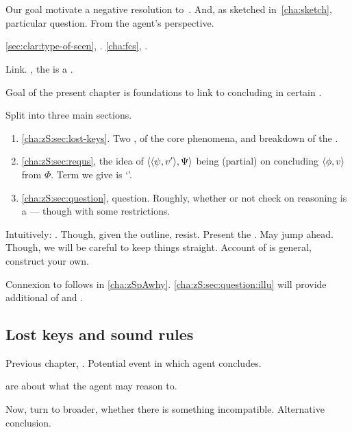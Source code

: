 \chapter{}
\label{cha:zS}

\begin{note}
  Our goal motivate a negative resolution to~\issueConstraint{}.
  And, as sketched in~\autoref{cha:sketch}, \zSN{} particular question.
  From the agent's perspective.

  \autoref{sec:clar:type-of-scen}, .
  \autoref{cha:fcs}, .

  Link.
  , the \collateral{} is a \fc{}.

  Goal of the present chapter is foundations to link  to concluding in certain .

  Split into three main sections.
  \begin{enumerate}
  \item
    \autoref{cha:zS:sec:lost-keys}.
    Two ,  of the core phenomena, and breakdown of the .
  \item
    \autoref{cha:zS:sec:requs}, the idea of \(\langle \langle \psi, v' \rangle, \Psi \rangle\) being (partial) \check{} on concluding \(\langle \phi, v \rangle\) from \(\Phi\).
    Term we give is `\requ{}'.
  \item
    \autoref{cha:zS:sec:question}, question.
    Roughly, whether or not check on reasoning is a  --- though with some restrictions.
  \end{enumerate}

  Intuitively: \qWhyV{}.
  Though, given the outline, resist.
  Present the .
  May jump ahead.
  Though, we will be careful to keep things straight.
  Account of  is general, construct your own.

  Connexion to \qWhyV{} follows in \autoref{cha:zSpAwhy}.
  \autoref{cha:zS:sec:question:illu} will provide additional  of \requ{} and \qzS{}.
\end{note}

\section{Lost keys and sound rules}
\label{cha:zS:sec:lost-keys}

\begin{note}
  Previous chapter, .
  Potential event in which agent concludes.

   are about what the agent may reason to.

  Now, turn to broader, whether there is something incompatible.
  Alternative conclusion.
\end{note}

